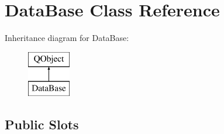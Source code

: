 \hypertarget{class_data_base}{}\section{Data\+Base Class Reference}
\label{class_data_base}
Inheritance diagram for Data\+Base\+:\begin{figure}[H]
\begin{center}
\leavevmode
\includegraphics[height=2.000000cm]{class_data_base}
\end{center}
\end{figure}
\subsection*{Public Slots}
